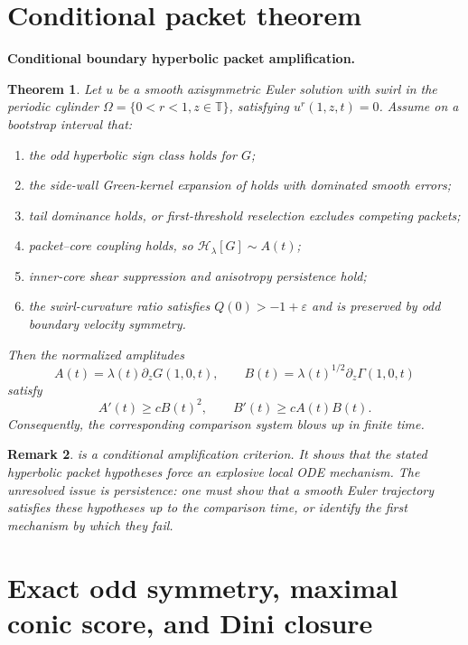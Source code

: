 \documentclass[11pt]{amsart}
\newtheorem{theorem}{Theorem}[section]
\newtheorem{remark}[theorem]{Remark}
\begin{document}
\section{Conditional packet theorem}

\medskip
\noindent\textbf{Conditional boundary hyperbolic packet amplification.}
\begin{theorem}\label{thm:conditional_packet}
Let \(u\) be a smooth axisymmetric Euler solution with swirl in the periodic cylinder \(\Omega=\{0<r<1,z\in\mathbb T\}\), satisfying \(u^r(1,z,t)=0\).  Assume on a bootstrap interval that:
\begin{enumerate}[label=(\roman*)]
\item the odd hyperbolic sign class holds for \(G\);
\item the side-wall Green-kernel expansion of  holds with dominated smooth errors;
\item tail dominance holds, or first-threshold reselection excludes competing packets;
\item packet--core coupling holds, so \(\mathcal H_\lambda[G]\sim A(t)\);
\item inner-core shear suppression and anisotropy persistence hold;
\item the swirl-curvature ratio satisfies \(Q(0)>-1+\varepsilon\) and is preserved by odd boundary velocity symmetry.
\end{enumerate}
Then the normalized amplitudes
\[
A(t)=\lambda(t)\partial_zG(1,0,t),
\qquad
B(t)=\lambda(t)^{1/2}\partial_z\Gamma(1,0,t)
\]
satisfy
\[
A'(t)\ge cB(t)^2,
\qquad
B'(t)\ge cA(t)B(t).
\]
Consequently, the corresponding comparison system blows up in finite time.
\end{theorem}

\begin{remark}
 is a conditional amplification criterion.  It shows that the stated hyperbolic packet hypotheses force an explosive local ODE mechanism.  The unresolved issue is persistence: one must show that a smooth Euler trajectory satisfies these hypotheses up to the comparison time, or identify the first mechanism by which they fail.
\end{remark}

\section{Exact odd symmetry, maximal conic score, and Dini closure}
\end{document}
